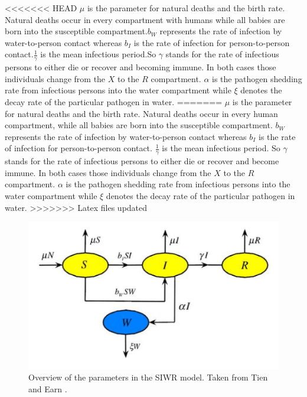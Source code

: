 \documentclass[11pt]{article}
\begin{document}
<<<<<<< HEAD
$ \mu $ is the parameter for natural deaths and the birth rate. Natural deaths occur in every compartment with humans while all babies are born into the susceptible compartment.$ b_{W} $ represents the rate of infection by water-to-person contact whereas $ b_{I} $ is the rate of infection for person-to-person contact.$ \frac{1}{\gamma} $ is the mean infectious period.So $ \gamma $ stands for the rate of infectious persons to either die or recover and becoming immune. In both cases those individuals change from the $ X $ to the $ R $ compartment. $ \alpha $ is the pathogen shedding rate from infectious persons into the water compartment while $ \xi $ denotes the decay rate of the particular pathogen in water.
=======
$ \mu $ is the parameter for natural deaths and the birth rate. Natural deaths occur in every human compartment, while all babies are born into the susceptible compartment. $ b_{W} $ represents the rate of infection by water-to-person contact whereas $ b_{I} $ is the rate of infection for person-to-person contact. $\frac{1}{\gamma } $ is the mean infectious period. So $ \gamma $ stands for the rate of infectious persons to either die or recover and become immune. In both cases those individuals change from the $ X $ to the $ R $ compartment. $ \alpha $ is the pathogen shedding rate from infectious persons into the water compartment while $ \xi $ denotes the decay rate of the particular pathogen in water.
>>>>>>> Latex files updated


\begin{figure}
\begin{center}


\includegraphics[scale=0.5]{Bilder/flow_diagram_SIWR.png}
\caption{Overview of the parameters in the SIWR model. Taken from Tien and Earn \cite{tien:2010}.}
\label{pic:flow_diagram}
\end{center}
\end{figure}
\end{document}
